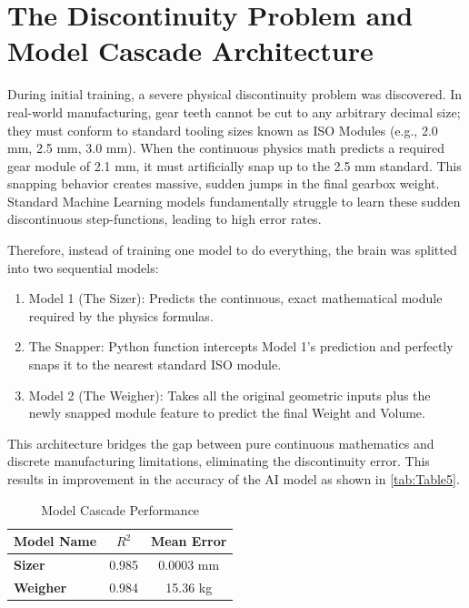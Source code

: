 \section{The Discontinuity Problem and Model Cascade Architecture}
    During initial training, a severe physical discontinuity problem was discovered. In real-world manufacturing, 
    gear teeth cannot be cut to any arbitrary decimal size; they must conform to standard tooling sizes known as 
    ISO Modules (e.g., 2.0 mm, 2.5 mm, 3.0 mm).  When the continuous physics math predicts a required gear module 
    of 2.1 mm, it must artificially snap up to the 2.5 mm standard. This snapping behavior creates massive, sudden 
    jumps in the final gearbox weight. Standard Machine Learning models fundamentally struggle to learn these 
    sudden discontinuous step-functions, leading to high error rates.

    Therefore, instead of training one model to do everything, the brain was splitted into two sequential models:
        \begin{enumerate}
            \item Model 1 (The Sizer): Predicts the continuous, exact mathematical module required by the physics formulas.
            \item The Snapper: Python function intercepts Model 1's prediction and perfectly snaps it to the nearest standard ISO module.
            \item Model 2 (The Weigher): Takes all the original geometric inputs plus the newly snapped module feature to predict the final Weight and Volume.
        \end{enumerate}

    This architecture bridges the gap between pure continuous mathematics and discrete manufacturing limitations, 
    eliminating the discontinuity error. This results in improvement in the accuracy of the AI model as shown in \autoref{tab:Table5}.
        \begin{table}[ht]
			\renewcommand{\arraystretch}{1.5}
			\centering
			\caption{Model Cascade Performance}
			\label{tab:Table5}
			\small
			\begin{tabular}{|l|c|c|}
				\hline
        		\textbf{Model Name} & \textbf{$R^2$} & \textbf{Mean Error} \\					
				\hline
				\textbf{Sizer} & 0.985 & 0.0003 mm \\
				\hline
				\textbf{Weigher} & 0.984 & 15.36 kg \\
				\hline
            \end{tabular}
		\end{table}

